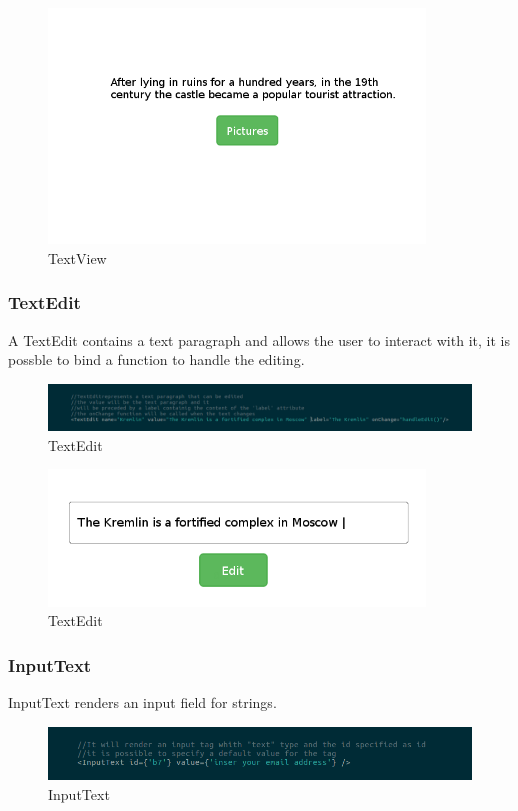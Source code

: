 \begin{figure}[H]
	\centering
	\includegraphics[width=10cm]{../../documenti/UserManualFramework/graphical_elements/textViewGE.png}
	\caption{TextView}
\end{figure}

\subsubsection{TextEdit}
A TextEdit contains a text paragraph and allows the user to interact with it, it is possble to bind a function to handle the editing.
\begin{figure}[H]
	\centering
	\includegraphics[width=14cm]{../../documenti/UserManualFramework/framework_view/15framework_view_textedit.png}
	\caption{TextEdit}
\end{figure}

\begin{figure}[H]
	\centering
	\includegraphics[width=10cm]{../../documenti/UserManualFramework/graphical_elements/textEditGE.png}
	\caption{TextEdit}
\end{figure}

\subsubsection{InputText}
InputText renders an input field for strings.
\begin{figure}[H]
	\centering
	\includegraphics[width=14cm]{../../documenti/UserManualFramework/framework_view/16framework_view_inputtext.png}
	\caption{InputText}
\end{figure}

